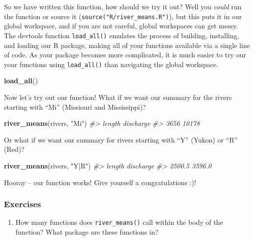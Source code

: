 \documentclass[
]{book}
\newenvironment{Shaded}{\begin{snugshade}}{\end{snugshade}}
\newcommand{\CommentTok}[1]{\textcolor[rgb]{0.56,0.35,0.01}{\textit{#1}}}
\newcommand{\KeywordTok}[1]{\textcolor[rgb]{0.13,0.29,0.53}{\textbf{#1}}}
\newcommand{\NormalTok}[1]{#1}
\newcommand{\StringTok}[1]{\textcolor[rgb]{0.31,0.60,0.02}{#1}}
\providecommand{\tightlist}{%
  \setlength{\itemsep}{0pt}\setlength{\parskip}{0pt}}
\begin{document}
So we have written this function, how should we try it out? Well you \emph{could}
run the function or source it (\texttt{source("R/river\_means.R")}), but this puts it in our global workspace, and if you are not careful, global workspaces can get messy. The devtools
function \texttt{load\_all()} emulates the process of building, installing, and loading our R package, making all of your functions available via a single line of code. As your package becomes more complicated, it is much easier to try our your functions using \texttt{load\_all()} than navigating the global workspace.

\begin{Shaded}
\begin{Highlighting}[]
\KeywordTok{load_all}\NormalTok{()}
\end{Highlighting}
\end{Shaded}

Now let's try out our function! What if we want our summary for the rivers starting with ``Mi'' (Missiouri and Mississippi)?

\begin{Shaded}
\begin{Highlighting}[]
\KeywordTok{river_means}\NormalTok{(rivers, }\StringTok{"Mi"}\NormalTok{)}
\CommentTok{#>    length discharge }
\CommentTok{#>      3656     10178}
\end{Highlighting}
\end{Shaded}

Or what if we want our summary for rivers starting with ``Y'' (Yukon) or ``R'' (Red)?

\begin{Shaded}
\begin{Highlighting}[]
\KeywordTok{river_means}\NormalTok{(rivers, }\StringTok{"Y|R"}\NormalTok{)}
\CommentTok{#>    length discharge }
\CommentTok{#>    2500.5    3596.0}
\end{Highlighting}
\end{Shaded}

Hooray -- our function works! Give yourself a congratulations :)!

\hypertarget{exercises-1}{%
\subsubsection{Exercises}\label{exercises-1}}

\begin{enumerate}
\def\labelenumi{\arabic{enumi}.}
\tightlist
\item
  How many functions does \texttt{river\_means()} call within the body of the function? What package are these functions in?
\end{enumerate}
\end{document}
